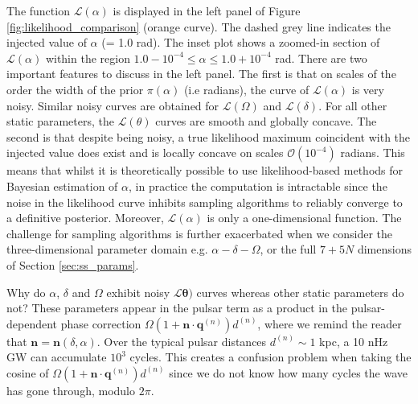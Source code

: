 \documentclass[fleqn,usenatbib,useAMS]{mnras}
\begin{document}
The function $\mathcal{L}(\alpha)$ is displayed in the left panel of Figure \ref{fig:likelihood_comparison} (orange curve). The dashed grey line indicates the injected value of $\alpha$ (= 1.0 rad). The inset plot shows a zoomed-in section of $\mathcal{L}(\alpha)$ within the region $ 1.0 - 10^{-4} \le \alpha \le 1.0 +10^{-4}$ rad.  There are two important features to discuss in the left panel. The first is that on scales of the order the width of the prior $\pi(\alpha)$ (i.e radians), the curve of $\mathcal{L}(\alpha)$ is very noisy. Similar noisy curves are obtained for $\mathcal{L}(\Omega)$ and $\mathcal{L}(\delta)$. For all other static parameters, the $\mathcal{L}(\theta)$ curves are smooth and globally concave. The second is that despite being noisy, a true likelihood maximum coincident with the injected value does exist and is locally concave on scales $\mathcal{O} \left( 10^{-4}\right)$ radians. This means that whilst it is theoretically possible to use likelihood-based methods for Bayesian estimation of $\alpha$, in practice the computation is intractable since the noise in the likelihood curve inhibits sampling algorithms to reliably converge to a definitive posterior. Moreover, $\mathcal{L}(\alpha)$ is only a one-dimensional function. The challenge for sampling algorithms is further exacerbated when we consider the three-dimensional parameter domain e.g. $\alpha - \delta - \Omega$, or the full $7 + 5N$ dimensions of Section \ref{sec:ss_params}. \newline 

Why do $\alpha$, $\delta$ and $\Omega$ exhibit noisy $\mathcal{L}\boldsymbol{\theta})$ curves whereas other static parameters do not? These parameters appear in the pulsar term as a product in the pulsar-dependent phase correction $\Omega \left(1 + \boldsymbol{n}\cdot \boldsymbol{q}^{(n)} \right)  d^{(n)}$, where we remind the reader that $\boldsymbol{n} = \boldsymbol{n}(\delta, \alpha)$. Over the typical pulsar distances $d^{(n)} \sim 1$ kpc, a 10 nHz GW can accumulate $10^3$ cycles. This creates a confusion problem when taking the cosine of  $\Omega \left(1 + \boldsymbol{n}\cdot \boldsymbol{q}^{(n)} \right)  d^{(n)}$ since we do not know how many cycles the wave has gone through, modulo $2 \pi$. \newline 
\end{document}
